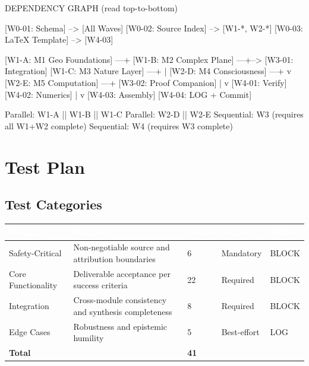 \documentclass[11pt,letterpaper]{article}
\newcommand{\tableheader}[1]{\textbf{\sffamily\textcolor{white}{#1}}}
\begin{document}
\begin{asciibox}
DEPENDENCY GRAPH (read top-to-bottom)

  [W0-01: Schema] --> [All Waves]
  [W0-02: Source Index] --> [W1-*, W2-*]
  [W0-03: LaTeX Template] --> [W4-03]

  [W1-A: M1 Geo Foundations] ---+
  [W1-B: M2 Complex Plane]  ---+--> [W3-01: Integration]
  [W1-C: M3 Nature Layer]   ---+        |
  [W2-D: M4 Consciousness]  ---+        v
  [W2-E: M5 Computation]    ---+  [W3-02: Proof Companion]
                                         |
                                         v
                                   [W4-01: Verify]
                                   [W4-02: Numerics]
                                         |
                                         v
                                   [W4-03: Assembly]
                                   [W4-04: LOG + Commit]

  Parallel: W1-A || W1-B || W1-C
  Parallel: W2-D || W2-E
  Sequential: W3 (requires all W1+W2 complete)
  Sequential: W4 (requires W3 complete)
\end{asciibox}

\section{Test Plan}

\subsection{Test Categories}

\begin{center}
\begin{tabularx}{\textwidth}{L{3.5cm}XC{2cm}C{2cm}C{1.8cm}}
\toprule
{}
\tableheader{Category} & \tableheader{Purpose} & \tableheader{Count} & \tableheader{Priority} & \tableheader{Failure} \\
\midrule
Safety-Critical & Non-negotiable source and attribution boundaries & 6 & Mandatory & BLOCK \\
Core Functionality & Deliverable acceptance per success criteria & 22 & Required & BLOCK \\
Integration & Cross-module consistency and synthesis completeness & 8 & Required & BLOCK \\
Edge Cases & Robustness and epistemic humility & 5 & Best-effort & LOG \\
\midrule
\textbf{Total} & & \textbf{41} & & \\
\bottomrule
\end{tabularx}
\end{center}
\end{document}
